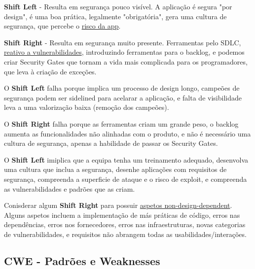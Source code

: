 \documentclass{article}
\begin{document}
\begin{flushleft}
  \textbf{Shift Left} - Resulta em segurança pouco visível.
  A aplicação é segura "por design", é uma boa prática,
  legalmente "obrigatória", gera uma cultura de segurança,
  que percebe o \uline{risco da app}.

  \vspace{1mm}

  \textbf{Shift Right} - Resulta em segurança muito presente.
  Ferramentas pelo SDLC, \uline{reativo a vulnerabilidades},
  introduzindo ferramentas para o backlog, e podemos criar
  Security Gates que tornam a vida mais complicada para os
  programadores, que leva à criação de exceções.

  \vspace{1mm}

  O \textbf{Shift Left} falha porque implica um processo de design longo,
  campeões de segurança podem ser sidelined para acelarar a aplicação,
  e falta de visibilidade leva a uma valorização baixa (remoção
  dos campeões).

  \vspace{1mm}

  O \textbf{Shift Right} falha porque as ferramentas criam um
  grande peso, o backlog aumenta as funcionalidades não
  alinhadas com o produto, e não é necessário
  uma cultura de segurança, apenas a habilidade de passar
  os Security Gates.

  \vspace{1mm}

  O \textbf{Shift Left} imiplica que a equipa tenha um treinamento
  adequado, desenvolva uma cultura que inclua a segurança,
  desenhe aplicações com requisitos de segurança, compreenda a
  superficie de ataque e o risco de exploit, e compreenda
  as vulnerabilidades e padrões que as criam.

  \vspace{1mm}

  Conisderar algum \textbf{Shift Right} para possuir
  \uline{aspetos non-design-dependent}. Alguns aspetos
  incluem a implementação de más práticas de código,
  erros nas dependências, erros nos fornecedores, erros nas
  infraestruturas, novas categorias de vulnerabilidades,
  e requisitos não abrangem todas as usabilidades/interações.
\end{flushleft}

\subsection{CWE - Padrões e Weaknesses}
\end{document}
